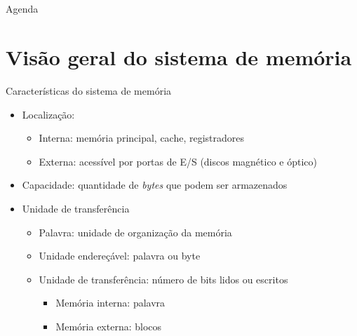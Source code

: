 



\title{\cursogrande\\ \vspace{1cm}{Memória cache}}


   \maketitle[randomdots={false}]
   
   \begin{slide}{Agenda}
      \tableofcontents[content=sections]
   \end{slide}
\section[slide=true]{Visão geral do sistema de memória}
\begin{slide}{Características do sistema de memória}
	\begin{itemize}
		\item Localização:
			\begin{itemize}
				\item Interna: memória principal, cache, registradores
				\item Externa: acessível por portas de E/S (discos magnético e óptico)
			\end{itemize}
		\item Capacidade: quantidade de \emph{bytes} que podem ser armazenados
		\item Unidade de transferência
			\begin{itemize}
				\item Palavra: unidade de organização da memória
				\item Unidade endereçável: palavra ou byte
				\item Unidade de transferência: número de bits lidos ou escritos
					\begin{itemize}
						\item Memória interna: palavra
						\item Memória externa: blocos
					\end{itemize}
			\end{itemize}
	\end{itemize}
\end{slide}

